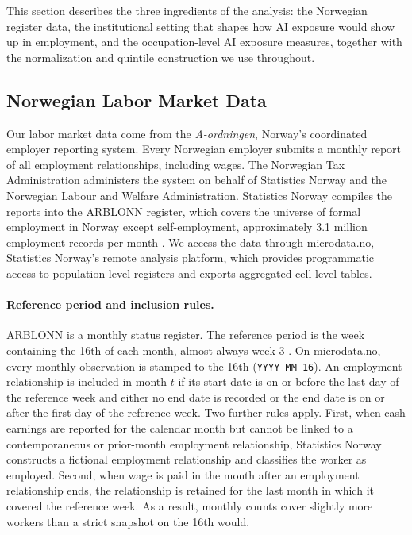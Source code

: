 \documentclass[12pt]{article}
\begin{document}
This section describes the three ingredients of the analysis: the Norwegian register data, the institutional setting that shapes how AI exposure would show up in employment, and the occupation-level AI exposure measures, together with the normalization and quintile construction we use throughout.

\subsection{Norwegian Labor Market Data}\label{sec:data:labor}

Our labor market data come from the \emph{A-ordningen}, Norway's coordinated employer reporting system. Every Norwegian employer submits a monthly report of all employment relationships, including wages. The Norwegian Tax Administration administers the system on behalf of Statistics Norway and the Norwegian Labour and Welfare Administration. Statistics Norway compiles the reports into the ARBLONN register, which covers the universe of formal employment in Norway except self-employment, approximately 3.1 million employment records per month \citep{ssb_arblonn_doc}. We access the data through microdata.no, Statistics Norway's remote analysis platform, which provides programmatic access to population-level registers and exports aggregated cell-level tables.

\paragraph{Reference period and inclusion rules.}
ARBLONN is a monthly status register. The reference period is the week containing the 16th of each month, almost always week 3 \citep{ssb_klassifisering}. On microdata.no, every monthly observation is stamped to the 16th (\texttt{YYYY-MM-16}). An employment relationship is included in month $t$ if its start date is on or before the last day of the reference week and either no end date is recorded or the end date is on or after the first day of the reference week. Two further rules apply. First, when cash earnings are reported for the calendar month but cannot be linked to a contemporaneous or prior-month employment relationship, Statistics Norway constructs a fictional employment relationship and classifies the worker as employed. Second, when wage is paid in the month after an employment relationship ends, the relationship is retained for the last month in which it covered the reference week. As a result, monthly counts cover slightly more workers than a strict snapshot on the 16th would.
\end{document}

